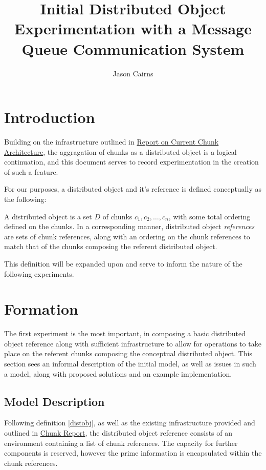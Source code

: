 \documentclass[a4paper,10pt]{article}
\begin{document}
\title{Initial Distributed Object Experimentation with a Message Queue Communication System}
\author{Jason Cairns}
  
\maketitle{}

\section{Introduction}

Building on the infrastructure outlined in \href{chunk-report.pdf}{Report on
Current Chunk Architecture}, the aggragation of chunks as a distributed object
is a logical continuation, and this document serves to record experimentation
in the creation of such a feature.

For our purposes, a distributed object and it's reference is defined
conceptually as the following:

\begin{defn}
	\label{distobj}
	A distributed object is a set \(D\) of chunks \(c_1, c_2, \dots, c_n\),
	with some total ordering defined on the chunks. 
	In a corresponding manner, distributed object \textit{references} are
	sets of chunk references, along with an ordering on the chunk
	references to match that of the chunks composing the referent
	distributed object.
\end{defn}

This definition will be expanded upon and serve to inform the nature of the
following experiments.

\section{Formation}

The first experiment is the most important, in composing a basic distributed
object reference along with sufficient infrastructure to allow for operations
to take place on the referent chunks composing the conceptual distributed
object.
This section sees an informal description of the initial model, as well as
issues in such a model, along with proposed solutions and an example
implementation.

\subsection{Model Description}

Following definition \ref{distobj}, as well as the existing infrastructure
provided and outlined in \href{chunk-report.pdf}{Chunk Report}, the distributed
object reference consists of an environment containing a list of chunk
references.
The capacity for further components is reserved, however the prime information
is encapsulated within the chunk references.
\end{document}
